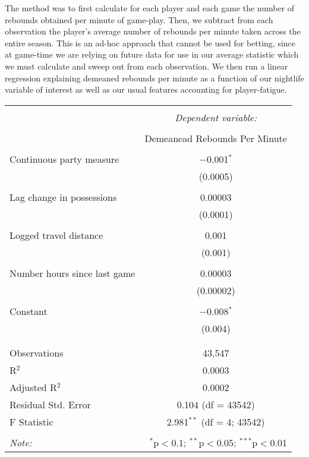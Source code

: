 \documentclass[letterpaper,12pt]{article}
\begin{document}
The method was to first calculate for each player and each game the number of rebounds obtained
per minute of game-play. Then, we subtract from each observation the player's average number of rebounds per minute taken across the entire season.
This is an ad-hoc approach that cannot be used for betting, since at game-time we are relying on future data for use in our average statistic which we must calculate and sweep out from each observation. We then run a linear regression 
explaining demeaned rebounds per minute as a function of our nightlife variable of interest
as well as our usual features accounting for player-fatigue.

\begin{tabular}{@{\extracolsep{5pt}}lc}  \\[-1.8ex]\hline  \hline \\[-1.8ex]   & \multicolumn{1}{c}{\textit{Dependent variable:}} \\  \cline{2-2}  \\[-1.8ex] & Demeanead Rebounds Per Minute \\  \hline \\[-1.8ex]   Continuous party measure & $-$0.001$^{*}$ \\    & (0.0005) \\    & \\   Lag change in possessions & 0.00003 \\    & (0.0001) \\    & \\   Logged travel distance & 0.001 \\    & (0.001) \\    & \\   Number hours since last game & 0.00003 \\    & (0.00002) \\    & \\   Constant & $-$0.008$^{*}$ \\    & (0.004) \\    & \\  \hline \\[-1.8ex]  Observations & 43,547 \\  R$^{2}$ & 0.0003 \\  Adjusted R$^{2}$ & 0.0002 \\  Residual Std. Error & 0.104 (df = 43542) \\  F Statistic & 2.981$^{**}$ (df = 4; 43542) \\  \hline  \hline \\[-1.8ex]  \textit{Note:}  & \multicolumn{1}{r}{$^{*}$p$<$0.1; $^{**}$p$<$0.05; $^{***}$p$<$0.01} \\  \end{tabular}  
\end{document}
